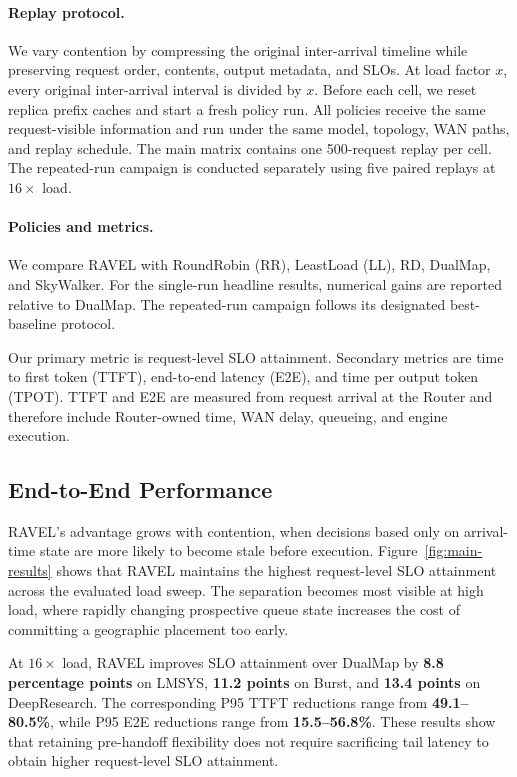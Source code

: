 \paragraph{Replay protocol.}
We vary contention by compressing the original inter-arrival timeline while
preserving request order, contents, output metadata, and SLOs.
At load factor $x$, every original inter-arrival interval is divided by $x$.
Before each cell, we reset replica prefix caches and start a fresh policy run.
All policies receive the same request-visible information and run under the
same model, topology, WAN paths, and replay schedule.
The main matrix contains one 500-request replay per cell.
The repeated-run campaign is conducted separately using five paired replays at
$16\times$ load.

\paragraph{Policies and metrics.}
We compare RAVEL with RoundRobin (RR), LeastLoad (LL), RD, DualMap, and
SkyWalker.
For the single-run headline results, numerical gains are reported relative to
DualMap.
The repeated-run campaign follows its designated best-baseline protocol.

Our primary metric is request-level SLO attainment.
Secondary metrics are time to first token (TTFT), end-to-end latency (E2E), and
time per output token (TPOT).
TTFT and E2E are measured from request arrival at the Router and therefore
include Router-owned time, WAN delay, queueing, and engine execution.


\subsection{End-to-End Performance}
\label{sec:eval:e2e}

RAVEL's advantage grows with contention, when decisions based only on
arrival-time state are more likely to become stale before execution.
Figure~\ref{fig:main-results} shows that RAVEL maintains the highest
request-level SLO attainment across the evaluated load sweep.
The separation becomes most visible at high load, where rapidly changing
prospective queue state increases the cost of committing a geographic
placement too early.

At $16\times$ load, RAVEL improves SLO attainment over DualMap by
\textbf{8.8 percentage points} on LMSYS,
\textbf{11.2 points} on Burst, and
\textbf{13.4 points} on DeepResearch.
The corresponding P95 TTFT reductions range from
\textbf{49.1--80.5\%}, while P95 E2E reductions range from
\textbf{15.5--56.8\%}.
These results show that retaining pre-handoff flexibility does not require
sacrificing tail latency to obtain higher request-level SLO attainment.

